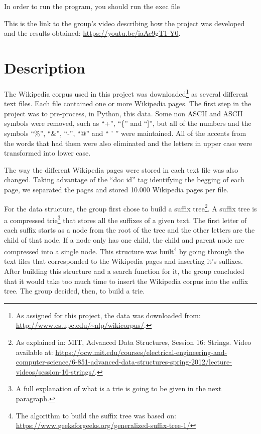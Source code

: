 \documentclass{article}
\begin{document}
In order to run the program, you should run the exec file 

This is the link to the group's video describing how the project was developed and the results obtained: \url{https://youtu.be/iaAe9gT1-Y0}. 

\section*{Description}
The Wikipedia corpus used in this project was downloaded\footnote{As assigned for this project, the data was downloaded from: \url{http://www.cs.upc.edu/~nlp/wikicorpus/}.}  as several different text files. Each file contained one or more Wikipedia pages. The first step in the project was to pre-process, in Python, this data. Some non ASCII and ASCII symbols were removed, such as ``+'', ``\{'' and ``]'', but all of the numbers and the symbols ``\%'', ``\&'', ``-'', ``@'' and `` ' '' were maintained. All of the accents from the words that had them were also eliminated and the letters in upper case were transformed into lower case. 

The way the different Wikipedia pages were stored in each text file was also changed. Taking advantage of the ``doc id'' tag identifying the begging of each page, we separated the pages and stored 10.000 Wikipedia pages per file. 

For the data structure, the group first chose to build a suffix tree\footnote{As explained in: MIT, Advanced Data Structures, Session 16: Strings. Video available at: \url{https://ocw.mit.edu/courses/electrical-engineering-and-computer-science/6-851-advanced-data-structures-spring-2012/lecture-videos/session-16-strings/}.}. A suffix tree is a compressed trie\footnote{A full explanation of what is a trie is going to be given in the next paragraph.} that stores all the suffixes of a given text. The first letter of each suffix starts as a node from the root of the tree and the other letters are the child of that node. If a node only has one child, the child and parent node are compressed into a single node. This structure was built\footnote{The algorithm to build the suffix tree was based on: \url{https://www.geeksforgeeks.org/generalized-suffix-tree-1/}} by going through the text files that corresponded to the Wikipedia pages and inserting it's suffixes. After building this structure and a search function for it, the group concluded that it would take too much time to insert the Wikipedia corpus into the suffix tree. The group decided, then, to build a trie. 
\end{document}
